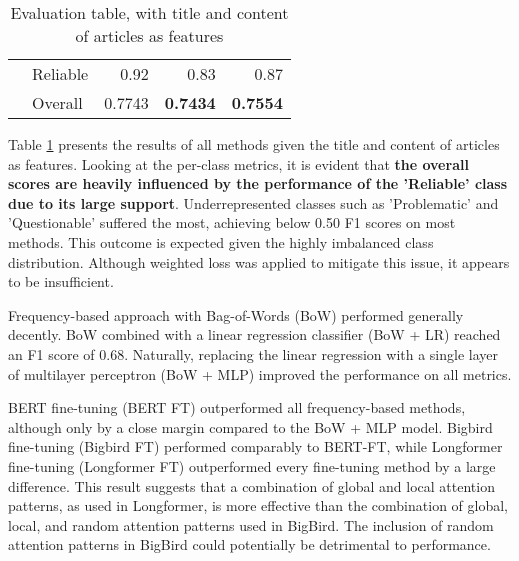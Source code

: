 \begin{table}[htbp]
\begin{longtable}{| c | l | r | r | r |}
                                                          & Reliable           & 0.92               & 0.83            & 0.87            \\\cline{2-5}
                                                          & Overall            & 0.7743             & \textbf{0.7434} & \textbf{0.7554} \\
        \hline
    \end{longtable}
    \caption{Evaluation table, with title and content of articles as features}
    \label{table:eval}
\end{table}

Table \ref{table:eval} presents the results of all methods given the title and content of articles as features. Looking at the per-class metrics, it is evident that \textbf{the overall scores are heavily influenced by the performance of the 'Reliable' class due to its large support}. Underrepresented classes such as 'Problematic' and 'Questionable' suffered the most, achieving below 0.50 F1 scores on most methods. This outcome is expected given the highly imbalanced class distribution. Although weighted loss was applied to mitigate this issue, it appears to be insufficient.

Frequency-based approach with Bag-of-Words (BoW) performed generally decently. BoW combined with a linear regression classifier (BoW + LR) reached an F1 score of 0.68.  Naturally, replacing the linear regression with a single layer of multilayer perceptron (BoW + MLP) improved the performance on all metrics.

BERT fine-tuning (BERT FT) outperformed all frequency-based methods, although only by a close margin compared to the BoW + MLP model. Bigbird fine-tuning (Bigbird FT) performed comparably to BERT-FT, while Longformer fine-tuning (Longformer FT) outperformed every fine-tuning method by a large difference. This result suggests that a combination of global and local attention patterns, as used in Longformer, is more effective than the combination of global, local, and random attention patterns used in BigBird. The inclusion of random attention patterns in BigBird could potentially be detrimental to performance.

